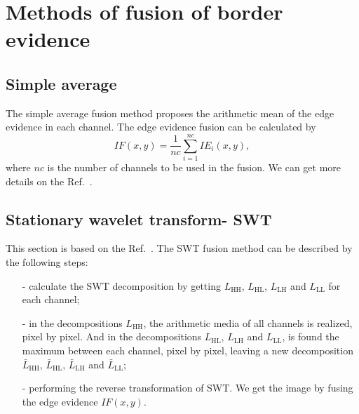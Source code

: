 \documentclass[conference]{IEEEtran}
\begin{document}
\section{Methods of fusion of border evidence}\label{sec_07}
\subsection{Simple average}
The simple average fusion method proposes the arithmetic mean of the edge evidence in each channel. The edge evidence fusion can be calculated by
\begin{equation}
	IF(x,y)=\frac{1}{nc}\sum_{i=1}^{nc}IE_i(x,y),
\end{equation}
where $nc$ is the number of channels to be used in the fusion. We can get more details on the Ref.~\cite{mit}.
\subsection{Stationary wavelet transform- SWT} 
This section is based on the Ref.~\cite{n_r}. The SWT fusion method can be described by the following steps:
\begin{itemize}
\item[-] calculate the SWT decomposition by getting $L_\text{HH}$, $L_\text{HL}$, $L_\text{LH}$ and $L_\text{LL}$ for each channel;
\item[-] in the decompositions $L_\text{HH}$, the arithmetic media of all channels is realized, pixel by pixel. And in the decompositions $L_\text{HL}$, $L_\text{LH}$ and $L_\text{LL}$, is found the maximum between each channel, pixel by pixel, leaving a new decomposition $\bar{L}_\text{HH}$, $\bar{L}_\text{HL}$, $\bar{L}_\text{LH}$ and $\bar{L}_\text{LL}$;
\item[-] performing the reverse transformation of SWT. We get the image by fusing the edge evidence $IF(x,y)$.  
\end{itemize}
\end{document}
